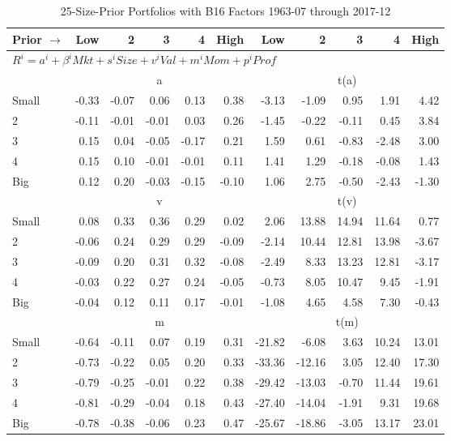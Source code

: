 
\begin{table}[!ht]
\scriptsize
\centering
\caption{25-Size-Prior Portfolios with B16 Factors 1963-07 through 2017-12}
\begin{tabular}{lrrrrrrrrrr}
  \toprule
    
    Prior $\rightarrow$ & Low & 2 & 3 & 4 & High & Low & 2 & 3 & 4 & High  \\ 
  \midrule
  \multicolumn{11}{l}{$R^i=a^i+\beta^iMkt+s^iSize+v^iVal+m^iMom+p^iProf$}  \\
  
     & \multicolumn{5}{c}{a} & \multicolumn{5}{c}{t(a)}   \\
     \cmidrule(r){2-6} \cmidrule(r){7-11} 
    Small  & -0.33  & -0.07  & 0.06  & 0.13  & 0.38  & -3.13  & -1.09  & 0.95  & 1.91  & 4.42   \\
    2  & -0.11  & -0.01  & -0.01  & 0.03  & 0.26  & -1.45  & -0.22  & -0.11  & 0.45  & 3.84   \\
    3  & 0.15  & 0.04  & -0.05  & -0.17  & 0.21  & 1.59  & 0.61  & -0.83  & -2.48  & 3.00   \\
    4  & 0.15  & 0.10  & -0.01  & -0.01  & 0.11  & 1.41  & 1.29  & -0.18  & -0.08  & 1.43   \\
    Big  & 0.12  & 0.20  & -0.03  & -0.15  & -0.10  & 1.06  & 2.75  & -0.50  & -2.43  & -1.30   \\
    
  
     & \multicolumn{5}{c}{v} & \multicolumn{5}{c}{t(v)}   \\
     \cmidrule(r){2-6} \cmidrule(r){7-11} 
    Small  & 0.08  & 0.33  & 0.36  & 0.29  & 0.02  & 2.06  & 13.88  & 14.94  & 11.64  & 0.77   \\
    2  & -0.06  & 0.24  & 0.29  & 0.29  & -0.09  & -2.14  & 10.44  & 12.81  & 13.98  & -3.67   \\
    3  & -0.09  & 0.20  & 0.31  & 0.32  & -0.08  & -2.49  & 8.33  & 13.23  & 12.81  & -3.17   \\
    4  & -0.03  & 0.22  & 0.27  & 0.24  & -0.05  & -0.73  & 8.05  & 10.47  & 9.45  & -1.91   \\
    Big  & -0.04  & 0.12  & 0.11  & 0.17  & -0.01  & -1.08  & 4.65  & 4.58  & 7.30  & -0.43   \\
    
  
     & \multicolumn{5}{c}{m} & \multicolumn{5}{c}{t(m)}   \\
     \cmidrule(r){2-6} \cmidrule(r){7-11} 
    Small  & -0.64  & -0.11  & 0.07  & 0.19  & 0.31  & -21.82  & -6.08  & 3.63  & 10.24  & 13.01   \\
    2  & -0.73  & -0.22  & 0.05  & 0.20  & 0.33  & -33.36  & -12.16  & 3.05  & 12.40  & 17.30   \\
    3  & -0.79  & -0.25  & -0.01  & 0.22  & 0.38  & -29.42  & -13.03  & -0.70  & 11.44  & 19.61   \\
    4  & -0.81  & -0.29  & -0.04  & 0.18  & 0.43  & -27.40  & -14.04  & -1.91  & 9.31  & 19.68   \\
    Big  & -0.78  & -0.38  & -0.06  & 0.23  & 0.47  & -25.67  & -18.86  & -3.05  & 13.17  & 23.01   \\
    

\end{tabular}
\end{table}

